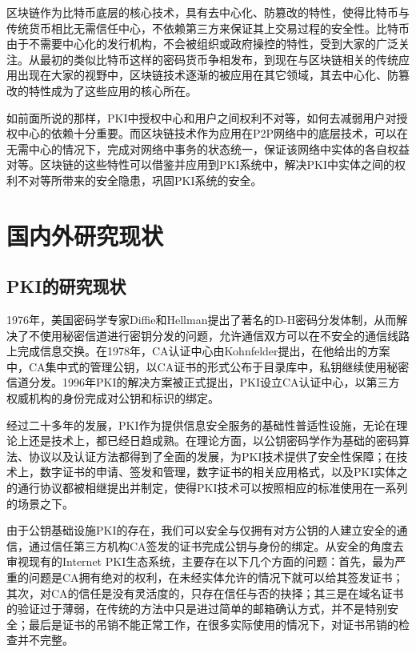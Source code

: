 区块链作为比特币底层的核心技术，具有去中心化、防篡改的特性，使得比特币与传统货币相比无需信任中心，不依赖第三方来保证其上交易过程的安全性。比特币由于不需要中心化的发行机构，不会被组织或政府操控的特性，受到大家的广泛关注。从最初的类似比特币这样的密码货币争相发布，到现在与区块链相关的传统应用出现在大家的视野中，区块链技术逐渐的被应用在其它领域，其去中心化、防篡改的特性成为了这些应用的核心所在。

如前面所说的那样，PKI中授权中心和用户之间权利不对等，如何去减弱用户对授权中心的依赖十分重要。而区块链技术作为应用在P2P网络中的底层技术，可以在无需中心的情况下，完成对网络中事务的状态统一，保证该网络中实体的各自权益对等。区块链的这些特性可以借鉴并应用到PKI系统中，解决PKI中实体之间的权利不对等所带来的安全隐患，巩固PKI系统的安全。


\section{国内外研究现状}

\subsection{PKI的研究现状}

1976年，美国密码学专家Diffie和Hellman提出了著名的D-H密码分发体制，从而解决了不使用秘密信道进行密钥分发的问题，允许通信双方可以在不安全的通信线路上完成信息交换。在1978年，CA认证中心由Kohnfelder提出，在他给出的方案中，CA集中式的管理公钥，以CA证书的形式公布于目录库中，私钥继续使用秘密信道分发。1996年PKI的解决方案被正式提出，PKI设立CA认证中心，以第三方权威机构的身份完成对公钥和标识的绑定。

经过二十多年的发展，PKI作为提供信息安全服务的基础性普适性设施，无论在理论上还是技术上，都已经日趋成熟。在理论方面，以公钥密码学作为基础的密码算法、协议以及认证方法都得到了全面的发展，为PKI技术提供了安全性保障；在技术上，数字证书的申请、签发和管理，数字证书的相关应用格式，以及PKI实体之的通行协议都被相继提出并制定，使得PKI技术可以按照相应的标准使用在一系列的场景之下。


由于公钥基础设施PKI的存在，我们可以安全与仅拥有对方公钥的人建立安全的通信，通过信任第三方机构CA签发的证书完成公钥与身份的绑定。从安全的角度去审视现有的Internet PKI生态系统，主要存在以下几个方面的问题：首先，最为严重的问题是CA拥有绝对的权利，在未经实体允许的情况下就可以给其签发证书；其次，对CA的信任是没有灵活度的，只存在信任与否的抉择；其三是在域名证书的验证过于薄弱，在传统的方法中只是进过简单的邮箱确认方式，并不是特别安全；最后是证书的吊销不能正常工作，在很多实际使用的情况下，对证书吊销的检查并不完整\supercite{ristic2014bulletproof}。

